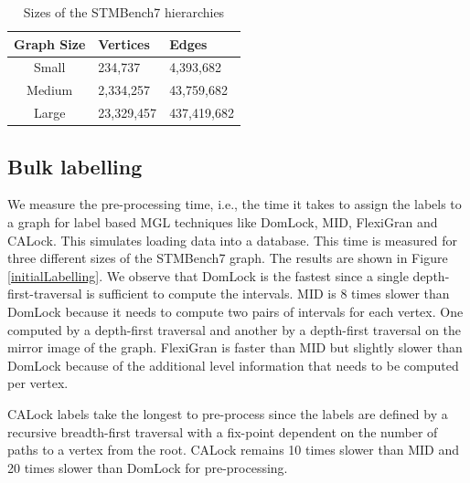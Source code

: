 \begin{table}[h]
	\centering
	\captionsetup{justification=centering}
	\begin{tabular}{c|ll}
		\textbf{Graph Size} & \textbf{Vertices} & \textbf{Edges} \\ \hline
		Small  & 234,737 	& 4,393,682 	\\
		Medium & 2,334,257 	& 43,759,682	\\
		Large  & 23,329,457 & 437,419,682 	\\
	\end{tabular}
	\caption{Sizes of the STMBench7 hierarchies}
	\label{tab:graphSizes}
\end{table}



\subsection{Bulk labelling}
We measure the pre-processing time, i.e., the time it takes to assign the labels to a graph for label based MGL techniques like DomLock, MID, FlexiGran and CALock.
This simulates loading data into a database.
This time is measured for three different sizes of the STMBench7 graph. 
The results are shown in Figure \ref{initialLabelling}. 
We observe that DomLock is the fastest since a single depth-first-traversal is sufficient to compute the intervals. MID is 8 times slower than DomLock because it needs to compute two pairs of intervals for each vertex. One computed by a depth-first traversal and another by a depth-first traversal on the mirror image of the graph. FlexiGran is faster than MID but slightly slower than DomLock because of the additional level information that needs to be computed per vertex. 

CALock labels take the longest to pre-process since the labels are defined by a recursive breadth-first traversal with a fix-point dependent on the number of paths to a vertex from the root. CALock remains 10 times slower than MID and 20 times slower than DomLock for pre-processing. 

